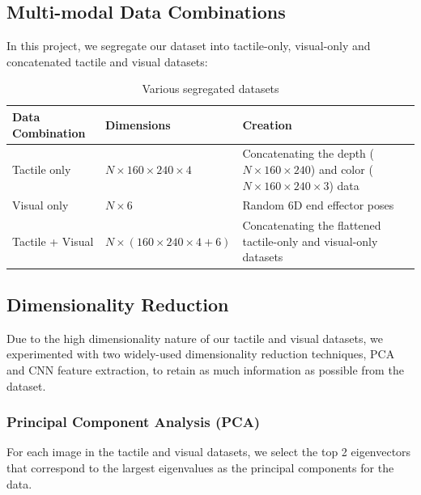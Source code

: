 \documentclass[12pt, a4paper]{report}
\theoremstyle{definition}
\begin{document}
\subsection{Multi-modal Data Combinations}
\label{sec:4.4.1}
In this project, we segregate our dataset into tactile-only, visual-only and concatenated tactile and visual datasets:
\begin{table}[H]
    \centering
    \begin{tabular}{|p{3cm}|p{4cm}|p{6cm}|}
        \hline
        Data Combination & Dimensions & Creation \\
        \hline
        Tactile only & $N\times160\times240\times4$ & Concatenating the depth ($N\times160\times240$) and color ($N\times160\times240\times3$) data \\
        \hline
        Visual only & $N\times6$ & Random 6D end effector poses \\
        \hline
        Tactile + Visual & $N\times(160\times240\times4+6)$ & Concatenating the flattened tactile-only and visual-only datasets \\
        \hline
    \end{tabular}
    \caption{Various segregated datasets}
    \label{tbl:4.1}
\end{table}


\subsection{Dimensionality Reduction}
\label{sec:4.4.2}
Due to the high dimensionality nature of our tactile and visual datasets, we experimented with two widely-used dimensionality reduction techniques, PCA and CNN feature extraction, to retain as much information as possible from the dataset.


\subsubsection{Principal Component Analysis (PCA)}
\label{sec:4.4.2.1}
For each image in the tactile and visual datasets, we select the top 2 eigenvectors that correspond to the largest eigenvalues as the principal components for the data.
\end{document}
